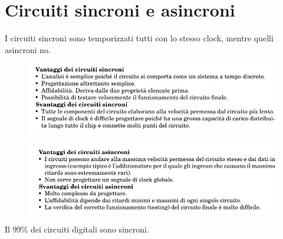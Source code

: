 \documentclass{book}
\begin{document}
    \section{Circuiti sincroni e asincroni}
        I circuiti sincroni sono temporizzati tutti con lo stesso clock, mentre quelli asincroni no.
        \begin{figure}[h!]
            \centering
            \includegraphics[width=0.75\linewidth]{img/chapt12img1.png}
        \end{figure}
        \begin{figure}[h!]
            \centering
            \includegraphics[width=0.75\linewidth]{img/chap12img2.png}
        \end{figure}
        Il 99\% dei circuiti digitali sono sincroni.
\end{document}
